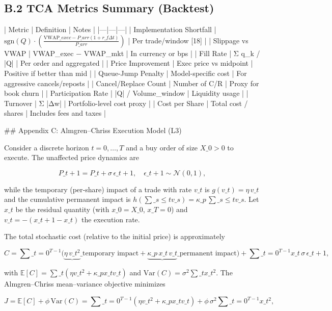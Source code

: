 \documentclass[11pt,a4paper]{article}
\begin{document}
\subsection{B.2 TCA Metrics Summary (Backtest)}

| Metric | Definition | Notes |
|---|---|---|
| Implementation Shortfall | $\text{sgn}(Q) \cdot \left(\frac{\text{VWAP}\_{exec} - P\_{arr}(1+r\_f \Delta t)}{P\_{arr}}\right)$ | Per trade/window [18] |
| Slippage vs VWAP | VWAP\_exec − VWAP\_mkt | In currency or bps |
| Fill Rate | Σ q\_k / |Q| | Per order and aggregated |
| Price Improvement | Exec price vs midpoint | Positive if better than mid |
| Queue-Jump Penalty | Model-specific cost | For aggressive cancels/reposts |
| Cancel/Replace Count | Number of C/R | Proxy for book churn |
| Participation Rate | |Q| / Volume\_window | Liquidity usage |
| Turnover | Σ |Δw| | Portfolio-level cost proxy |
| Cost per Share | Total cost / shares | Includes fees and taxes |
 
\#\# Appendix C: Almgren–Chriss Execution Model (L3)

Consider a discrete horizon $t=0,\ldots,T$ and a buy order of size $X\_0>0$ to execute. The unaffected price dynamics are

\begin{equation}
P\_{t+1} = P\_t + \sigma\,\epsilon\_{t+1},\quad \epsilon\_{t+1}\sim\mathcal{N}(0,1),
\end{equation}

while the temporary (per‑share) impact of a trade with rate $v\_t$ is $g(v\_t)=\eta\,v\_t$ and the cumulative permanent impact is $h(\sum\_{s\le t} v\_s)=\kappa\_p\,\sum\_{s\le t} v\_s$. Let $x\_t$ be the residual quantity (with $x\_0=X\_0$, $x\_T=0$) and $v\_t=-(x\_{t+1}-x\_t)$ the execution rate.

The total stochastic cost (relative to the initial price) is approximately

\begin{equation}
C = \sum\_{t=0}^{T-1} \big( \underbrace{\eta\,v\_t^2}\_{\text{temporary impact}} + \underbrace{\kappa\_p\,x\_t\,v\_t}\_{\text{permanent impact}} \big) + \sum\_{t=0}^{T-1} x\_t\,\sigma\,\epsilon\_{t+1},
\end{equation}

with $\mathbb{E}[C] = \sum\_t (\eta v\_t^2 + \kappa\_p x\_t v\_t)$ and $\mathrm{Var}(C)=\sigma^2\sum\_t x\_t^2$. The Almgren–Chriss mean–variance objective minimizes

\begin{equation}
J = \mathbb{E}[C] + \phi\,\mathrm{Var}(C) = \sum\_{t=0}^{T-1} (\eta v\_t^2 + \kappa\_p x\_t v\_t) + \phi\,\sigma^2\sum\_{t=0}^{T-1} x\_t^2,
\end{equation}
\end{document}

